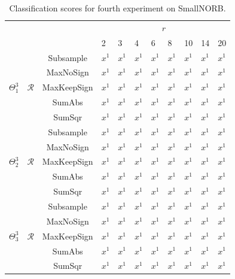 \documentclass[12pt,a4paper,oneside,english]{UPBThesis}
\begin{document}
\renewcommand{\arraystretch}{1.2}
\begin{table}
  \caption{Classification scores for fourth experiment on SmallNORB.}
  \label{table:RecoderEvNORBSmallSmallResultsRr}
  \begin{tabularx}{\textwidth}{ccc|RRRRRRRR|}
    & & &  \tabularnewline
    & & & 2 & 3 & 4 & 6 & 8 & 10 & 14 & 20 \tabularnewline\hline
     &  & Subsample   & $x^1$ & $x^1$ & $x^1$ & $x^1$ & $x^1$ & $x^1$ & $x^1$ & $x^1$ \tabularnewline
     &  & MaxNoSign   & $x^1$ & $x^1$ & $x^1$ & $x^1$ & $x^1$ & $x^1$ & $x^1$ & $x^1$ \tabularnewline
     &  & MaxKeepSign & $x^1$ & $x^1$ & $x^1$ & $x^1$ & $x^1$ & $x^1$ & $x^1$ & $x^1$ \tabularnewline
     &  & SumAbs      & $x^1$ & $x^1$ & $x^1$ & $x^1$ & $x^1$ & $x^1$ & $x^1$ & $x^1$ \tabularnewline
     &  & SumSqr      & $x^1$ & $x^1$ & $x^1$ & $x^1$ & $x^1$ & $x^1$ & $x^1$ & $x^1$ \tabularnewline\hline\hline
     &  & Subsample   & $x^1$ & $x^1$ & $x^1$ & $x^1$ & $x^1$ & $x^1$ & $x^1$ & $x^1$ \tabularnewline
     &  & MaxNoSign   & $x^1$ & $x^1$ & $x^1$ & $x^1$ & $x^1$ & $x^1$ & $x^1$ & $x^1$ \tabularnewline
     &  & MaxKeepSign & $x^1$ & $x^1$ & $x^1$ & $x^1$ & $x^1$ & $x^1$ & $x^1$ & $x^1$ \tabularnewline
     &  & SumAbs      & $x^1$ & $x^1$ & $x^1$ & $x^1$ & $x^1$ & $x^1$ & $x^1$ & $x^1$ \tabularnewline
     &  & SumSqr      & $x^1$ & $x^1$ & $x^1$ & $x^1$ & $x^1$ & $x^1$ & $x^1$ & $x^1$ \tabularnewline\hline\hline
     &  & Subsample   & $x^1$ & $x^1$ & $x^1$ & $x^1$ & $x^1$ & $x^1$ & $x^1$ & $x^1$ \tabularnewline
     &  & MaxNoSign   & $x^1$ & $x^1$ & $x^1$ & $x^1$ & $x^1$ & $x^1$ & $x^1$ & $x^1$ \tabularnewline
     &  & MaxKeepSign & $x^1$ & $x^1$ & $x^1$ & $x^1$ & $x^1$ & $x^1$ & $x^1$ & $x^1$ \tabularnewline
     &  & SumAbs      & $x^1$ & $x^1$ & $x^1$ & $x^1$ & $x^1$ & $x^1$ & $x^1$ & $x^1$ \tabularnewline
     &  & SumSqr      & $x^1$ & $x^1$ & $x^1$ & $x^1$ & $x^1$ & $x^1$ & $x^1$ & $x^1$ \tabularnewline\hline
  \end{tabularx}
\end{table}
\renewcommand{\arraystretch}{1.0}
\end{document}
